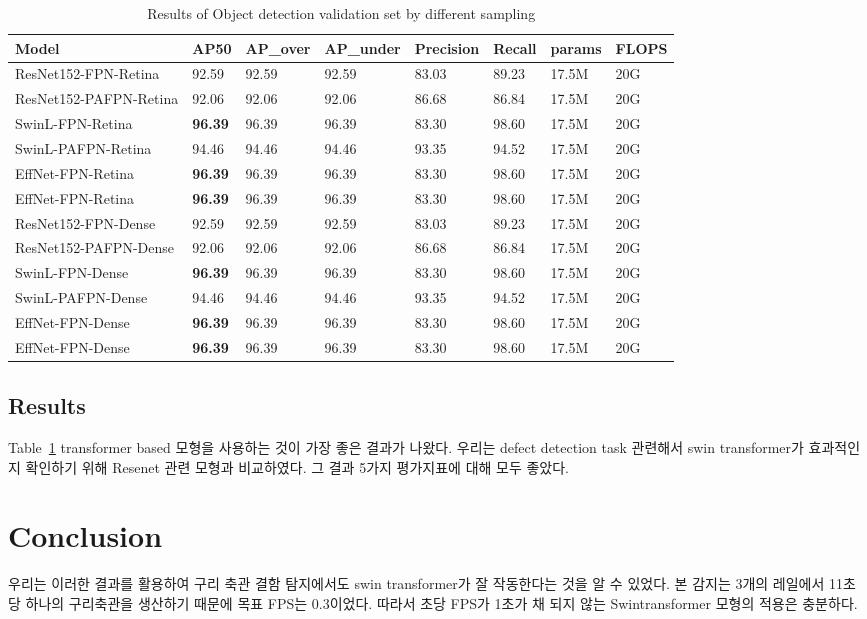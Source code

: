 \documentclass[10pt,twocolumn,letterpaper]{article}
\begin{document}
\begin{table}[tp]
  \centering
\begin{tabular}{|l|l|l|l|l|l|l|l|}
    \toprule
  Model                  & AP50 & AP\_over & AP\_under & Precision & Recall & params & FLOPS \\ \midrule
  ResNet152-FPN-Retina   & 92.59   & 92.59  & 92.59 & 83.03   & 89.23 & 17.5M & 20G    \\ 
  ResNet152-PAFPN-Retina & 92.06   & 92.06  & 92.06 & 86.68   & 86.84  & 17.5M & 20G   \\ 
  SwinL-FPN-Retina       & \textbf{96.39}   & 96.39  & 96.39 & 83.30   & 98.60 & 17.5M & 20G      \\ 
  SwinL-PAFPN-Retina     & 94.46   & 94.46  & 94.46 & 93.35   & 94.52  & 17.5M  & 20G  \\  
  EffNet-FPN-Retina       & \textbf{96.39}   & 96.39  & 96.39 & 83.30   & 98.60 & 17.5M & 20G      \\ 
  EffNet-FPN-Retina       & \textbf{96.39}   & 96.39  & 96.39 & 83.30   & 98.60 & 17.5M & 20G     \\ \bottomrule
  ResNet152-FPN-Dense   & 92.59   & 92.59  & 92.59 & 83.03   & 89.23 & 17.5M & 20G    \\ 
  ResNet152-PAFPN-Dense & 92.06   & 92.06  & 92.06 & 86.68   & 86.84  & 17.5M & 20G   \\ 
  SwinL-FPN-Dense       & \textbf{96.39}   & 96.39  & 96.39 & 83.30   & 98.60 & 17.5M & 20G      \\ 
  SwinL-PAFPN-Dense     & 94.46   & 94.46  & 94.46 & 93.35   & 94.52  & 17.5M  & 20G  \\  
  EffNet-FPN-Dense       & \textbf{96.39}   & 96.39  & 96.39 & 83.30   & 98.60 & 17.5M & 20G      \\ 
  EffNet-FPN-Dense       & \textbf{96.39}   & 96.39  & 96.39 & 83.30   & 98.60 & 17.5M & 20G     \\ \bottomrule
  \end{tabular}
  \caption{Results of Object detection validation set by different sampling}\label{exp:model}
  \end{table}
\subsection{Results}
Table~\ref{exp:model} transformer based 모형을 사용하는 것이 가장 좋은 결과가 나왔다.
우리는 defect detection task 관련해서 swin transformer가 효과적인지 확인하기 위해 Resenet 관련 모형과 비교하였다.
그 결과 5가지 평가지표에 대해 모두 좋았다.
\section{Conclusion}
우리는 이러한 결과를 활용하여 구리 축관 결함 탐지에서도 swin transformer가 잘 작동한다는 것을 알 수 있었다.
본 감지는 3개의 레일에서 11초당 하나의 구리축관을 생산하기 때문에 목표 FPS는 0.3이었다.
따라서 초당 FPS가 1초가 채 되지 않는 Swintransformer 모형의 적용은 충분하다.


{\nocite{*}


}
\end{document}
